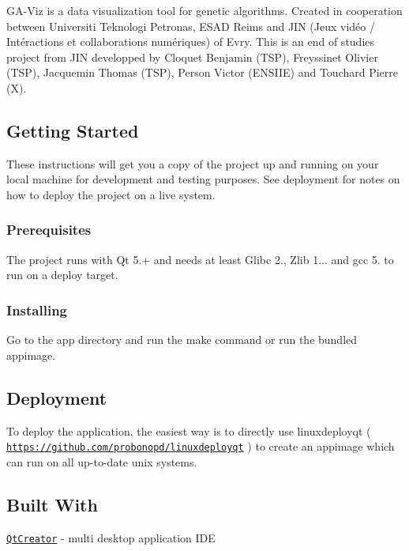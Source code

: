 G\+A-\/\+Viz is a data visualization tool for genetic algorithms. Created in cooperation between Universiti Teknologi Petronas, E\+S\+AD Reims and J\+IN (Jeux vidéo / Intéractions et collaborations numériques) of Evry. This is an end of studies\textquotesingle{} project from J\+IN developped by Cloquet Benjamin (T\+SP), Freyssinet Olivier (T\+SP), Jacquemin Thomas (T\+SP), Person Victor (E\+N\+S\+I\+IE) and Touchard Pierre (X).

\subsection*{Getting Started}

These instructions will get you a copy of the project up and running on your local machine for development and testing purposes. See deployment for notes on how to deploy the project on a live system.

\subsubsection*{Prerequisites}

The project runs with Qt 5.+ and needs at least Glibc 2., Zlib 1... and gcc 5. to run on a deploy target.

\subsubsection*{Installing}

Go to the app directory and run the make command or run the bundled appimage.

\subsection*{Deployment}

To deploy the application, the easiest way is to directly use linuxdeployqt ( \href{https://github.com/probonopd/linuxdeployqt}{\tt https\+://github.\+com/probonopd/linuxdeployqt} ) to create an appimage which can run on all up-\/to-\/date unix systems.

\subsection*{Built With}


\begin{DoxyItemize}
\item \href{http://doc.qt.io/qtcreator/}{\tt Qt\+Creator} -\/ multi desktop application I\+DE
\end{DoxyItemize}


